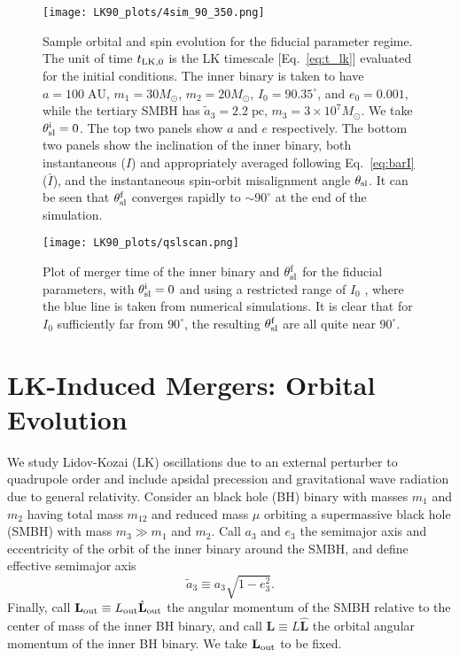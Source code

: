 \documentclass[
        twocolumn,
        twocolappendix
    ]{aastex63}
\renewcommand*{\bm}[1]{\boldsymbol{\mathbf{#1}}}
\newcommand*{\uv}[1]{\hat{\bm{#1}}}
\begin{document}
\begin{figure}
    \centering
    \texttt{[image: LK90\_plots/4sim\_90\_350.png]}
    \caption{Sample orbital and spin evolution for the fiducial parameter
    regime. The unit of time $t_{\rm LK, 0}$ is the LK timescale
    [Eq.~\eqref{eq:t_lk}] evaluated for the initial conditions. The inner binary
    is taken to have $a = 100\;\mathrm{AU}$, $m_1 = 30M_{\odot}$, $m_2 =
    20M_{\odot}$, $I_0 = 90.35^\circ$, and $e_0 = 0.001$, while the tertiary
    SMBH has $\tilde{a}_3 = 2.2\;\mathrm{pc}$, $m_3 = 3 \times 10^7 M_{\odot}$.
    We take $\theta_{\rm sl}^{\rm i} = 0$. The top two panels show $a$ and $e$
    respectively. The bottom two panels show the inclination of the inner
    binary, both instantaneous ($I$) and appropriately averaged following
    Eq.~\eqref{eq:barI} ($\bar{I}$), and the instantaneous spin-orbit
    misalignment angle $\theta_{\rm sl}$. It can be seen that $\theta_{\rm
    sl}^{\rm f}$ converges rapidly to $\sim 90^\circ$ at the end of the
    simulation.}\label{fig:4sim_90_350}
\end{figure}
\begin{figure}
    \centering
    \texttt{[image: LK90\_plots/qslscan.png]}
    \caption{Plot of merger time of the inner binary and $\theta_{\rm sl}^{\rm
    f}$ for the fiducial parameters, with $\theta_{\rm sl}^{\rm
    i} = 0$ and using a restricted range of $I_0$ \citep[analogous to the
    bottom-most panel in Fig.~3 of][]{bin2}, where the blue line is taken from
    numerical simulations. It is clear that for $I_0$ sufficiently far from
    $90^\circ$, the resulting $\theta_{\rm sl}^{\rm f}$ are all quite near
    $90^\circ$\citep{bin2}.}\label{fig:qslscan}
\end{figure}

\section{LK-Induced Mergers: Orbital Evolution}\label{s:setup_orbital}

We study Lidov-Kozai (LK) oscillations due to an external perturber to
quadrupole order and include apsidal precession and gravitational wave
radiation due to general relativity. Consider an black hole (BH) binary
with masses $m_1$ and $m_2$ having total mass $m_{12}$ and reduced mass $\mu$
orbiting a supermassive black hole (SMBH) with mass $m_3 \gg m_1$ and $m_2$.
Call $a_3$ and $e_3$ the semimajor axis and eccentricity of the orbit of the
inner binary around the SMBH, and define effective semimajor axis
\begin{equation}
    \tilde{a}_3 \equiv a_3\sqrt{1 - e_3^2}.
\end{equation}
Finally, call $\bm{L}_{\rm out} \equiv L_{\rm out} \uv{L}_{\rm out}$ the angular
momentum of the SMBH relative to the center of mass of the inner BH binary, and
call $\bm{L} \equiv L \uv{L}$ the orbital angular momentum of the inner BH
binary. We take $\bm{L}_{\rm out}$ to be fixed.
\end{document}
